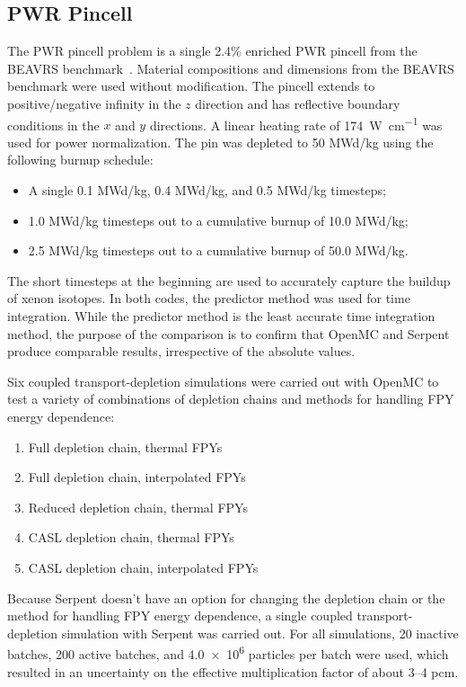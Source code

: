 \documentclass[3p,authoryear]{elsarticle}
\begin{document}
\subsection{PWR Pincell}

The PWR pincell problem is a single 2.4\% enriched PWR pincell from the BEAVRS
benchmark~\citep{horelik2013mc,horelik2018mit}. Material compositions and
dimensions from the BEAVRS benchmark were used without modification. The pincell
extends to positive/negative infinity in the $z$ direction and has reflective
boundary conditions in the $x$ and $y$ directions. A linear heating rate of
\SI{174}{\watt\per\centi\meter} was used for power normalization. The pin was
depleted to 50 MWd/kg using the following burnup schedule:
\begin{itemize}
  \item A single 0.1 MWd/kg, 0.4 MWd/kg, and 0.5 MWd/kg timesteps;
  \item 1.0 MWd/kg timesteps out to a cumulative burnup of 10.0 MWd/kg;
  \item 2.5 MWd/kg timesteps out to a cumulative burnup of 50.0 MWd/kg.
\end{itemize}
The short timesteps at the beginning are used to accurately capture the buildup
of xenon isotopes. In both codes, the predictor method was used for time
integration. While the predictor method is the least accurate time integration
method, the purpose of the comparison is to confirm that OpenMC and Serpent
produce comparable results, irrespective of the absolute values.

Six coupled transport-depletion simulations were carried out with OpenMC to test
a variety of combinations of depletion chains and methods for handling FPY
energy dependence:
\begin{enumerate}
  \item Full depletion chain, thermal FPYs
  \item Full depletion chain, interpolated FPYs
  \item Reduced depletion chain, thermal FPYs
  \item CASL depletion chain, thermal FPYs
  \item CASL depletion chain, interpolated FPYs
\end{enumerate}
Because Serpent doesn't have an option for changing the depletion chain or the
method for handling FPY energy dependence, a single coupled transport-depletion
simulation with Serpent was carried out. For all simulations, 20 inactive
batches, 200 active batches, and \num{4.0e6} particles per batch were used,
which resulted in an uncertainty on the effective multiplication factor of about
3--4 pcm.
\end{document}
